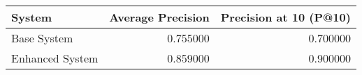 \begin{tabular}{lrr}
\toprule
System & Average Precision & Precision at 10 (P@10) \\
\midrule
Base System & 0.755000 & 0.700000 \\
Enhanced System & 0.859000 & 0.900000 \\
\bottomrule
\end{tabular}
